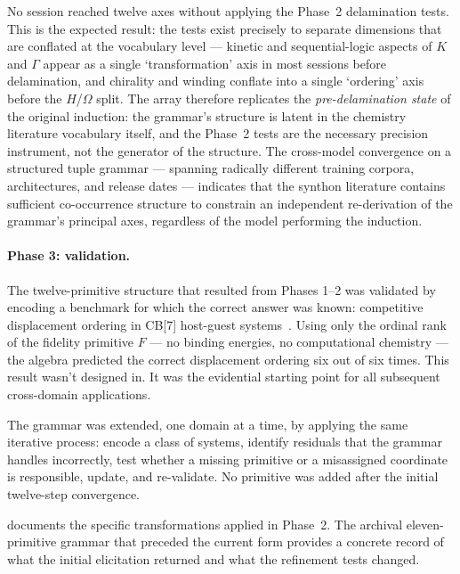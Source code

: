 \documentclass[12pt,a4paper]{article}
\begin{document}
No session reached twelve axes without applying the Phase~2 delamination
tests. This is the expected result: the tests exist precisely to separate
dimensions that are conflated at the vocabulary level --- kinetic and
sequential-logic aspects of $K$ and $\Gamma$ appear as a single
`transformation' axis in most sessions before delamination, and
chirality and winding conflate into a single `ordering' axis before the
$H$/$\Omega$ split. The array therefore replicates the \emph{pre-delamination
state} of the original induction: the grammar's structure is latent in
the chemistry literature vocabulary itself, and the Phase~2 tests are
the necessary precision instrument, not the generator of the structure.
The cross-model convergence on a structured tuple grammar --- spanning
radically different training corpora, architectures, and release
dates --- indicates that the synthon literature contains sufficient
co-occurrence structure to constrain an independent re-derivation of the
grammar's principal axes, regardless of the model performing the
induction.

\paragraph{Phase 3: validation.}
The twelve-primitive structure that resulted from Phases 1--2 was
validated by encoding a benchmark for which the correct answer was
known: competitive displacement ordering in CB[7] host-guest
systems~\cite{kim2001,assaf2015}. Using only the ordinal rank of the
fidelity primitive $F$ --- no binding energies, no computational
chemistry --- the algebra predicted the correct displacement ordering
six out of six times. This result wasn't designed in. It was the
evidential starting point for all subsequent cross-domain applications.

The grammar was extended, one domain at a time, by applying the same
iterative process: encode a class of systems, identify residuals that
the grammar handles incorrectly, test whether a missing primitive or a
misassigned coordinate is responsible, update, and re-validate.
No primitive was added after the initial twelve-step convergence.

 documents the specific transformations
applied in Phase~2. The archival eleven-primitive grammar that preceded
the current form provides a concrete record of what the initial elicitation
returned and what the refinement tests changed.
\end{document}
